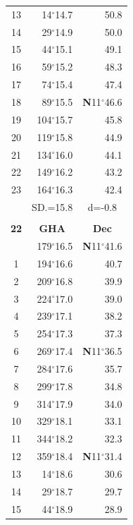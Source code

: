 \documentclass[10pt, a4paper]{report}
\begin{document}
\begin{scriptsize}
\begin{tabular*}{0.2\textwidth}[t]{@{\extracolsep{\fill}}|c|rr|}
13 & 14$^\circ$14.7 & 50.8\\
14 & 29$^\circ$14.9 & 50.0\\
15 & 44$^\circ$15.1 & \raisebox{0.24ex}{\boldmath$\cdot$~\boldmath$\cdot$~~}49.1\\
16 & 59$^\circ$15.2 & 48.3\\
17 & 74$^\circ$15.4 & 47.4\\[2Pt]
18 & 89$^\circ$15.5 & \textbf{N}11$^\circ$46.6\\
19 & 104$^\circ$15.7 & 45.8\\
20 & 119$^\circ$15.8 & 44.9\\
21 & 134$^\circ$16.0 & \raisebox{0.24ex}{\boldmath$\cdot$~\boldmath$\cdot$~~}44.1\\
22 & 149$^\circ$16.2 & 43.2\\
23 & 164$^\circ$16.3 & 42.4\\
\hline
\rule{0pt}{2.4ex} & \multicolumn{1}{c}{SD.=15.8} & \multicolumn{1}{c|}{d=-0.8}\\
\hline
\multicolumn{1}{c}{}\\[-0.5ex]\hline
\multicolumn{1}{|c|}{\rule{0pt}{2.6ex}\textbf{22}} & \multicolumn{1}{c}{\textbf{GHA}} & \multicolumn{1}{c|}{\textbf{Dec}}\\
\hline\rule{0pt}{2.6ex}\noindent
0 & 179$^\circ$16.5 & \textbf{N}11$^\circ$41.6\\
1 & 194$^\circ$16.6 & 40.7\\
2 & 209$^\circ$16.8 & 39.9\\
3 & 224$^\circ$17.0 & \raisebox{0.24ex}{\boldmath$\cdot$~\boldmath$\cdot$~~}39.0\\
4 & 239$^\circ$17.1 & 38.2\\
5 & 254$^\circ$17.3 & 37.3\\[2Pt]
6 & 269$^\circ$17.4 & \textbf{N}11$^\circ$36.5\\
7 & 284$^\circ$17.6 & 35.7\\
8 & 299$^\circ$17.8 & 34.8\\
9 & 314$^\circ$17.9 & \raisebox{0.24ex}{\boldmath$\cdot$~\boldmath$\cdot$~~}34.0\\
10 & 329$^\circ$18.1 & 33.1\\
11 & 344$^\circ$18.2 & 32.3\\[2Pt]
12 & 359$^\circ$18.4 & \textbf{N}11$^\circ$31.4\\
13 & 14$^\circ$18.6 & 30.6\\
14 & 29$^\circ$18.7 & 29.7\\
15 & 44$^\circ$18.9 & \raisebox{0.24ex}{\boldmath$\cdot$~\boldmath$\cdot$~~}28.9\\

\end{tabular*}
\end{scriptsize}
\end{document}
